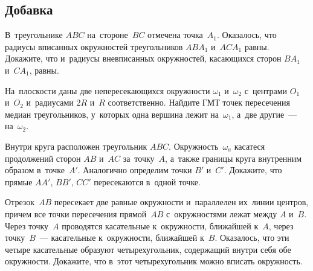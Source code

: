 

\subsection*{Добавка}


\begin{problems}

\item
В~треугольнике $ABC$ на~стороне~$BC$ отмечена точка~$A_1$.
Оказалось, что радиусы вписанных окружностей треугольников $A B A_1$
и~$A C A_1$ равны.
Докажите, что и~радиусы вневписанных окружностей, касающихся сторон $B A_1$
и~$C A_1$, равны.

\item
На~плоскости даны две непересекающихся окружности $\omega_1$ и~$\omega_2$
с~центрами $O_1$ и~$O_2$ и~радиусами $2 R$ и~$R$ соответственно.
Найдите ГМТ точек пересечения медиан треугольников, у~которых одна вершина
лежит на~$\omega_1$, а~две другие~--- на~$\omega_2$.

\item
Внутри круга расположен треугольник $ABC$.
Окружность~$\omega_a$ касатеся продолжений сторон $AB$ и~$AC$ за~точку~$A$,
а~также границы круга внутренним образом в~точке~$A'$.
Аналогично определим точки $B'$ и~$C'$.
Докажите, что прямые $AA'$, $BB'$, $CC'$ пересекаются в~одной точке.

\item
Отрезок~$AB$ пересекает две равные окружности и~параллелен их~линии центров,
причем все точки пересечения прямой~$AB$ с~окружностями лежат между $A$ и~$B$.
Через точку~$A$ проводятся касательные к~окружности, ближайшей к~$A$, через
точку~$B$~--- касательные к~окружности, ближайшей к~$B$.
Оказалось, что эти четыре касательные образуют четырехугольник, содержащий
внутри себя обе окружности.
Докажите, что в~этот четырехугольник можно вписать окружность.

\end{problems}

